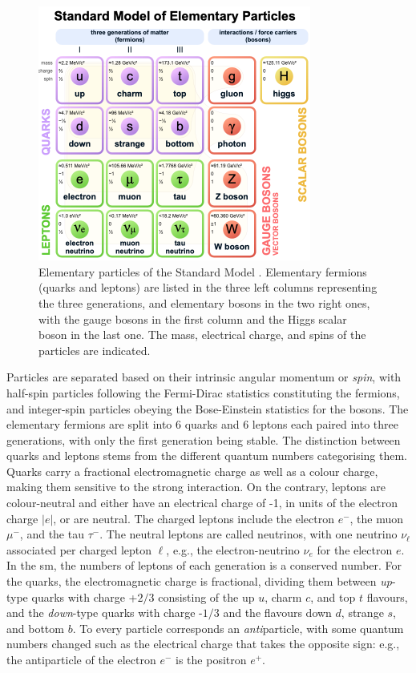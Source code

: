 \begin{figure}[!h]
    \centering
    \includegraphics[width=0.8\textwidth]{Images/Theory/SMpart.png}
    \caption[Particles in the SM]{Elementary particles of the Standard Model \cite{tableSMWiki}. Elementary fermions (quarks and leptons) are listed in the three left columns representing the three generations, and elementary bosons in the two right ones, with the gauge bosons in the first column and the Higgs scalar boson in the last one. The mass, electrical charge, and spins of the particles are indicated.}
    \label{particlesSM}
\end{figure}

Particles are separated based on their intrinsic angular momentum or \textit{spin}, with half-spin particles following the Fermi-Dirac statistics constituting the fermions, and integer-spin particles obeying the Bose-Einstein statistics for the bosons. The elementary fermions are split into 6 quarks and 6 leptons each paired into three generations, with only the first generation being stable. The distinction between quarks and leptons stems from the different quantum numbers categorising them. Quarks carry a fractional electromagnetic charge as well as a colour charge, making them sensitive to the strong interaction. On the contrary, leptons are colour-neutral and either have an electrical charge of -1, in units of the electron charge $|e|$, or are neutral. The charged leptons include the electron $e^-$, the muon $\mu^-$, and the tau $\tau^-$. The neutral leptons are called neutrinos, with one neutrino $\nu_\ell$ associated per charged lepton $\ell$, e.g., the electron-neutrino $\nu_e$ for the electron $e$. In the \gls{sm}, the numbers of leptons of each generation is a conserved number. For the quarks, the electromagnetic charge is fractional, dividing them between \textit{up}-type quarks with charge +$2/3$ consisting of the up $u$, charm $c$, and top $t$ flavours, and the \textit{down}-type quarks with charge -$1/3$ and the flavours down $d$, strange $s$, and bottom $b$. To every particle corresponds an \textit{anti}particle, with some quantum numbers changed such as the electrical charge that takes the opposite sign: e.g., the antiparticle of the electron $e^-$ is the positron $e^+$. \\

